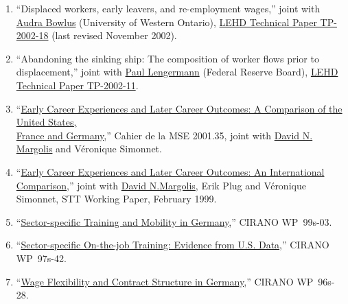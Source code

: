\documentclass[10pt,letterpaper]{report}
\begin{document}
\begin{enumerate}
  {John M. Abowd} (Cornell University
  and U.S. Census Bureau) and {Paul
    Lengermann} (Federal Reserve Board), \\
\href{http://lehd.dsd.census.gov/led/library/techpapers_2003.html}{LEHD Technical Paper TP-2002-13}.%
\item ``Displaced workers, early leavers, and re-employment wages,'' joint
with \href{mailto:abowlus@uwo.ca}{Audra Bowlus} (University of Western
Ontario), \href{http://lehd.dsd.census.gov/led/library/techpapers_2002.html}{LEHD Technical Paper TP-2002-18} (last revised November 2002).%
\item ``Abandoning the sinking ship: The composition of worker flows prior to
displacement,'' joint with \href{mailto:Paul.A.Lengermann@frb.gov}{Paul
  Lengermann} (Federal Reserve Board), \href{http://lehd.dsd.census.gov/led/library/techpapers_2002.html}{LEHD Technical Paper TP-2002-11}.%
\item ``\href{http://lamia02.univ-paris1.fr/WPs/Early Career Experiences and
  Later Career Outcomes - A Comparison of the United States, France and
  Germany.PDF}{Early Career Experiences and Later Career Outcomes: A
  Comparison of the United States,}\\ 
     \href{http://lamia02.univ-paris1.fr/WPs/Early Career Experiences and
  Later Career Outcomes - A Comparison of the United States, France and
  Germany.PDF}{France and Germany},'' Cahier de la MSE 2001.35, joint with
\href{mailto:margolis@univ-paris1.fr}{David N. Margolis} and
V\'eronique Simonnet. 
\item ``\href{http://lamia02.univ-paris1.fr/WPs/Early Career Experiences and Later Career Outcomes-An International Comparison.PDF}{Early Career Experiences and Later Career Outcomes: An
  International}
  \href{http://lamia02.univ-paris1.fr/WPs/Early Career Experiences and Later Career Outcomes-An International Comparison.PDF}{ Comparison},'' joint with
\href{mailto:margolis@univ-paris1.fr}{David N.Margolis}, Erik Plug and V\'eronique Simonnet, STT Working Paper, February 1999.%
\item
``\href{http://www.cirano.qc.ca/en/publication_detail.php?id=99s-03}{Sector-specific Training and  Mobility in Germany},'' CIRANO WP~99s-03.%
\item
``\href{http://www.cirano.qc.ca/en/publication_detail.php?id=97s-42}{Sector-specific On-the-job Training: Evidence from U.S. Data},''  CIRANO WP~97s-42.%
\item
``\href{http://www.cirano.qc.ca/en/publication_detail.php?id=96s-28}{Wage
  Flexibility and Contract Structure in Germany},'' CIRANO WP~96s-28.%
\end{enumerate}
\end{document}
